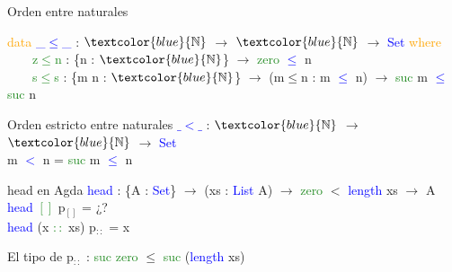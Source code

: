 \documentclass[xcolor=dvipsnames]{beamer} %
\newcommand{\cf}[1]{\textcolor{blue}{#1}}
\newcommand{\ct}[1]{\textcolor{blue}{#1}}
\newcommand{\cc}[1]{\textcolor{ForestGreen}{#1}}
\newcommand{\ck}[1]{\textcolor{orange}{#1}}
\newcommand{\N}{\ct{\mathbb{N}}}
\newcommand{\ra}{\rightarrow}
\begin{document}
\begin{frame}

\begin{block}{Orden entre naturales}

\ck{data} \ct{\_$\leq$\_} : $\N$ $\ra$ $\N$ $\ra$ \ct{Set} \ck{where}\\
\ \ \ \ \cc{z$\leq$n} : \{n : $\N$\}                 $\ra$ \cc{zero}  \ct{$\leq$} n\\
\ \ \ \ \cc{s$\leq$s} : \{m n : $\N$\} $\ra$ (m$\leq$n : m \ct{$\leq$} n) $\ra$ \cc{suc} m \ct{$\leq$} \cc{suc} n

\end{block}

\begin{block}{Orden estricto entre naturales}
\cf{$\_<\_$} : $\N$ $\ra$ $\N$ $\ra$ \ct{Set}\\
m \cf{$<$} n = \cc{suc} m \cf{$\leq$} n
\end{block}

\begin{block}{head en Agda}
    \cf{head} : \{A : \ct{Set}\}  $\ra$ (xs : \ct{List} A) $\ra$ 
    \cc{zero} $<$ \ct{length} xs $\rightarrow$ A \\
    \cf{head} \cc{$[]$} p$_{[]}$ = ¿?\\
    \cf{head} (x \cc{$::$} xs) p$_{::}$ = x
  \end{block}  

\begin{block}{}
El tipo de p$_{::}$ : \cc{suc} \cc{zero} $\leq$ \cc{suc} (\cf{length} xs)
\end{block}

\end{frame}
\end{document}
